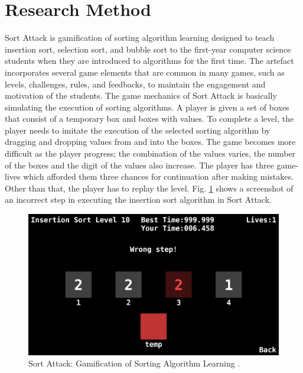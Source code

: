 \documentclass[conference]{IEEEtran}
\begin{document}
\section{Research Method}
\label{sec:research_method}

Sort Attack is gamification of sorting algorithm learning designed to teach insertion sort, selection sort, and bubble sort to the first-year computer science students when they are introduced to algorithms for the first time. The artefact incorporates several game elements that are common in many games, such as levels, challenges, rules, and feedbacks, to maintain the engagement and motivation of the students. The game mechanics of Sort Attack is basically simulating the execution of sorting algorithms. A player is given a set of boxes that consist of a temporary box and boxes with values. To complete a level, the player needs to imitate the execution of the selected sorting algorithm by dragging and dropping values from and into the boxes. The game becomes more difficult as the player progress; the combination of the values varies, the number of the boxes and the digit of the values also increase. The player has three game-lives which afforded them three chances for continuation after making mistakes. Other than that, the player has to replay the level. Fig. \ref{fig:sort-attack} shows a screenshot of an incorrect step in executing the insertion sort algorithm in Sort Attack.

\begin{figure}
  \centering
  \includegraphics[width=\linewidth]{sort-attack}
  \caption{Sort Attack: Gamification of Sorting Algorithm Learning \cite{yohannis2015sort}.}
  \label{fig:sort-attack}
\end{figure}
\end{document}
